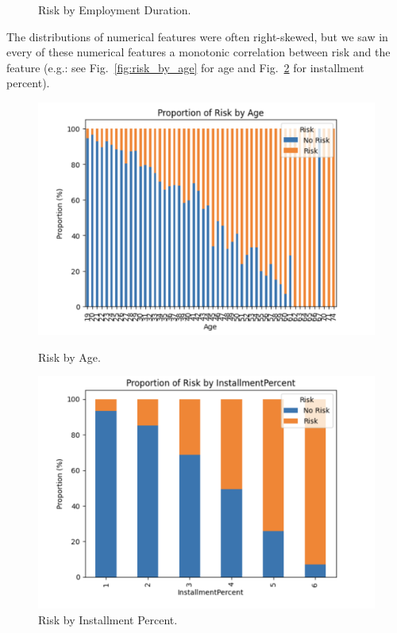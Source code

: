 \documentclass[12pt]{report}
\begin{document}
\begin{figure}[htbp]
\begin{minipage}[t]{0.45\textwidth}
        \caption{Risk by Employment Duration.}
        \label{fig:risk_by_employmentduration}
    \end{minipage}
\end{figure}

The distributions of numerical features were often right-skewed, but we saw in every of these numerical features a monotonic correlation between risk and the feature (e.g.: see Fig.~\ref{fig:risk_by_age} for age and Fig.~\ref{fig:risk_by_installmentpercent} for installment percent).

\begin{figure}[htbp]
    \centering
    \begin{minipage}[t]{0.45\textwidth}
        \centering
        \includegraphics[width=\textwidth]{risk_by_age.png}
        \caption{Risk by Age.}
        \label{fig:risk_by_age}
    \end{minipage}
    \hfill
    \begin{minipage}[t]{0.45\textwidth}
        \centering
        \includegraphics[width=\textwidth]{risk_by_installmentpercent.png}
        \caption{Risk by Installment Percent.}
        \label{fig:risk_by_installmentpercent}
    \end{minipage}
\end{figure}
\end{document}

